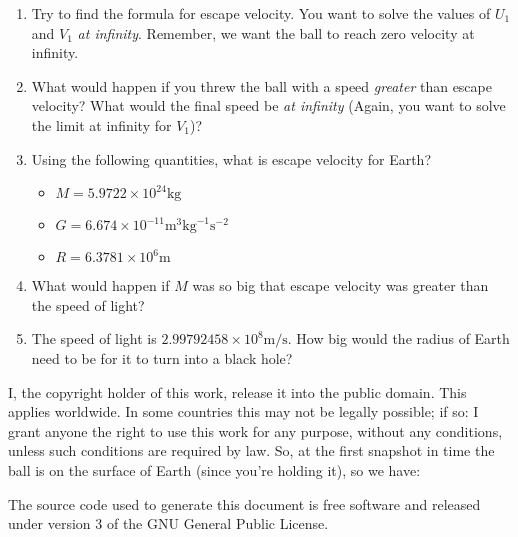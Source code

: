 \documentclass{article}
\begin{document}
    \begin{enumerate}
        \item Try to find the formula for escape velocity. You want to solve
              the values of $U_{1}$ and $V_{1}$ \textit{at infinity}. Remember,
              we want the ball to reach zero velocity at infinity.
        \item What would happen if you threw the ball with a speed
              \textit{greater} than escape velocity? What would the final speed
              be \textit{at infinity} (Again, you want to solve the limit at
              infinity for $V_{1}$)?
        \item Using the following quantities, what is escape velocity for Earth?
            \begin{itemize}
                \item $M=5.9722\times10^{24}\text{kg}$
                \item $G=6.674\times10^{-11}\text{m}^{3}\text{kg}^{-1}\text{s}^{-2}$
                \item $R=6.3781\times{10}^{6}\text{m}$
            \end{itemize}
        \item What would happen if $M$ was so big that escape velocity was
              greater than the speed of light?
        \item The speed of light is
              $2.99792458\times{10}^{8}\text{m}/\text{s}$. How big would
              the radius of Earth need to be for it to turn into a black hole?
    \end{enumerate}
    \newpage
    I, the copyright holder of this work, release it into the public domain.
    This applies worldwide. In some countries this may not be legally possible;
    if so: I grant anyone the right to use this work for any purpose, without
    any conditions, unless such conditions are required by law. So, at the
    first snapshot in time the ball is on the surface of Earth (since you're
    holding it), so we have:
    \par\hfill\par
    The source code used to generate this document is free software and released
    under version 3 of the GNU General Public License.
\end{document}
